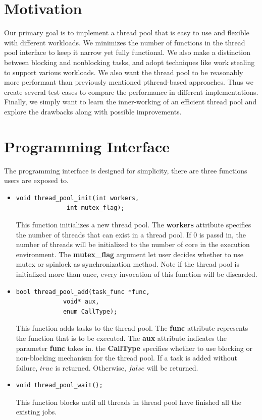 \documentclass[journal, a4paper]{IEEEtran}
\begin{document}
\section{Motivation}
	Our primary goal is to implement a thread pool that is easy to use and flexible with different workloads. We minimizes the number of functions in the thread pool interface to keep it narrow yet fully functional. We also make a distinction between blocking and nonblocking tasks, and adopt techniques like work stealing to support various workloads.
	We also want the thread pool to be reasonably more performant than previously mentioned pthread-based approaches. Thus we create several test cases to compare the performance in different implementations. Finally, we simply want to learn the inner-working of an efficient thread pool and explore the drawbacks along with possible improvements.\\
	
\section{Programming Interface}
The programming interface is designed for simplicity, there are three functions users are exposed to.\\

\begin{itemize}
	\item \begin{lstlisting}
void thread_pool_init(int workers, 
		      int mutex_flag);
	\end{lstlisting}
	This function initializes a new thread pool. The \textbf{workers} attribute specifies the number of threads that can exist in a thread pool. If $0$ is passd in, the number of threads will be initialized to the number of core in the execution environment. The \textbf{mutex\_flag} argument let user decides whether to use mutex or spinlock as synchronization method. Note if the thread pool is initialized more than once, every invocation of this function will be discarded.\\
	\item 
	\begin{lstlisting}
bool thread_pool_add(task_func *func,
		     void* aux,
		     enum CallType);
	\end{lstlisting}
	This function adds tasks to the thread pool. The \textbf{func} attribute represents the function that is to be executed. The \textbf{aux} attribute indicates the parameter \textbf{func} takes in. the \textbf{CallType} specifies whether to use blocking or non-blocking mechanism for the thread pool. If a task is added without failure, $true$ is returned. Otherwise, $false$ will be returned.\\
	\item \begin{lstlisting}
void thread_pool_wait();
	\end{lstlisting}
	This function blocks until all threads in thread pool have finished all the existing jobs.
		\end{itemize}
\end{document}

